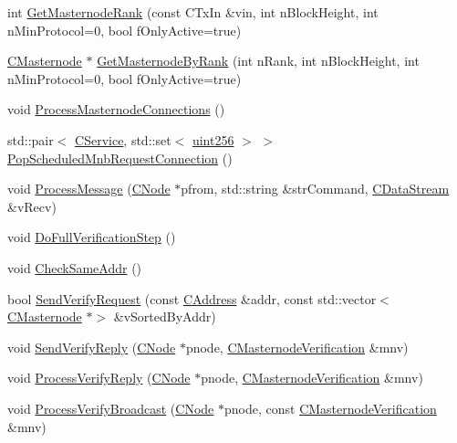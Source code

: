 \begin{DoxyCompactItemize}
\item 
int \mbox{\hyperlink{class_c_masternode_man_ae1dae6a840e09fa1dd05a0fe92f8a037}{Get\+Masternode\+Rank}} (const C\+Tx\+In \&vin, int n\+Block\+Height, int n\+Min\+Protocol=0, bool f\+Only\+Active=true)
\item 
\mbox{\hyperlink{class_c_masternode}{C\+Masternode}} $\ast$ \mbox{\hyperlink{class_c_masternode_man_a7cdee6daa692c9f74c08f98a8eebd5ba}{Get\+Masternode\+By\+Rank}} (int n\+Rank, int n\+Block\+Height, int n\+Min\+Protocol=0, bool f\+Only\+Active=true)
\item 
void \mbox{\hyperlink{class_c_masternode_man_ad8a9994f53e2d6385b8caba4cd5ee4b9}{Process\+Masternode\+Connections}} ()
\item 
std\+::pair$<$ \mbox{\hyperlink{class_c_service}{C\+Service}}, std\+::set$<$ \mbox{\hyperlink{classuint256}{uint256}} $>$ $>$ \mbox{\hyperlink{class_c_masternode_man_ac3691f1c70af48026fc9c3bbb69197ee}{Pop\+Scheduled\+Mnb\+Request\+Connection}} ()
\item 
void \mbox{\hyperlink{class_c_masternode_man_ae3e5d263cebdcd932eca49caeadce9aa}{Process\+Message}} (\mbox{\hyperlink{class_c_node}{C\+Node}} $\ast$pfrom, std\+::string \&str\+Command, \mbox{\hyperlink{class_c_data_stream}{C\+Data\+Stream}} \&v\+Recv)
\item 
void \mbox{\hyperlink{class_c_masternode_man_a676320abc2fe30a7b8d9466ae7b6dee5}{Do\+Full\+Verification\+Step}} ()
\item 
void \mbox{\hyperlink{class_c_masternode_man_a51d9db5f0c37a9994f1249800db13a78}{Check\+Same\+Addr}} ()
\item 
bool \mbox{\hyperlink{class_c_masternode_man_ab879231aa8d9aeceefe9931a44b95789}{Send\+Verify\+Request}} (const \mbox{\hyperlink{class_c_address}{C\+Address}} \&addr, const std\+::vector$<$ \mbox{\hyperlink{class_c_masternode}{C\+Masternode}} $\ast$$>$ \&v\+Sorted\+By\+Addr)
\item 
void \mbox{\hyperlink{class_c_masternode_man_a57016f150d9977cb22c08ba5cfa3f190}{Send\+Verify\+Reply}} (\mbox{\hyperlink{class_c_node}{C\+Node}} $\ast$pnode, \mbox{\hyperlink{class_c_masternode_verification}{C\+Masternode\+Verification}} \&mnv)
\item 
void \mbox{\hyperlink{class_c_masternode_man_a9a96a97210dd939754ef496efdf7fe70}{Process\+Verify\+Reply}} (\mbox{\hyperlink{class_c_node}{C\+Node}} $\ast$pnode, \mbox{\hyperlink{class_c_masternode_verification}{C\+Masternode\+Verification}} \&mnv)
\item 
void \mbox{\hyperlink{class_c_masternode_man_a0731112eab2636186ca00f01bedd723e}{Process\+Verify\+Broadcast}} (\mbox{\hyperlink{class_c_node}{C\+Node}} $\ast$pnode, const \mbox{\hyperlink{class_c_masternode_verification}{C\+Masternode\+Verification}} \&mnv)
$$
\end{DoxyCompactItemize}
